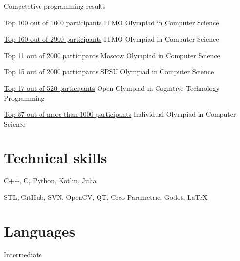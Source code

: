 \documentclass[12pt,a4paper]{moderncv}
\begin{document}
        \cventry{} {Competetive programming results} {} {} {} {}
        
         {\href {https://olymp.ifmo.ru/ru/p/it-test/827} {Top 100 out of 1600 participants}}
            {ITMO Olympiad in Computer Science} {} {} {}
        
         {\href {https://olymp.ifmo.ru/ru/p/olymp-it-18-19/1212} {Top 160 out of 2900 participants}}
            {ITMO Olympiad in Computer Science} {} {} {}
        
         {\href {http://mos-inf.olimpiada.ru/winners10-11-2019} {Top 11 out of 2000 participants}}
            {Moscow Olympiad in Computer Science} {} {} {}
        
         {\href {https://diploma.rsr-olymp.ru/files/rsosh-diplomas-static/compiled-storage-2019/by-code/141299110240/color.pdf} {Top 15 out of 2000 participants}}
            {SPSU Olympiad in Computer Science} {} {} {}
            
         {\href {https://diploma.rsr-olymp.ru/files/rsosh-diplomas-static/compiled-storage-2019/by-code/142158979050/color.pdf} {Top 17 out of 520 participants}}
            {Open Olympiad in Cognitive Technology Programming} {} {} {}
        
         {\href {https://neerc.ifmo.ru/school/ioip/standings-2019.html} {Top 87 out of more than 1000 participants}}
            {Individual Olympiad in Computer Science} {} {} {}
    
    \section{Technical skills}
    
         {C++, C, Python, Kotlin, Julia }
        
         {STL, GitHub, SVN, OpenCV, QT, Creo Parametric, Godot, \LaTeX}
    
    \section{Languages}
    
         {Intermediate}
        
\end{document}
